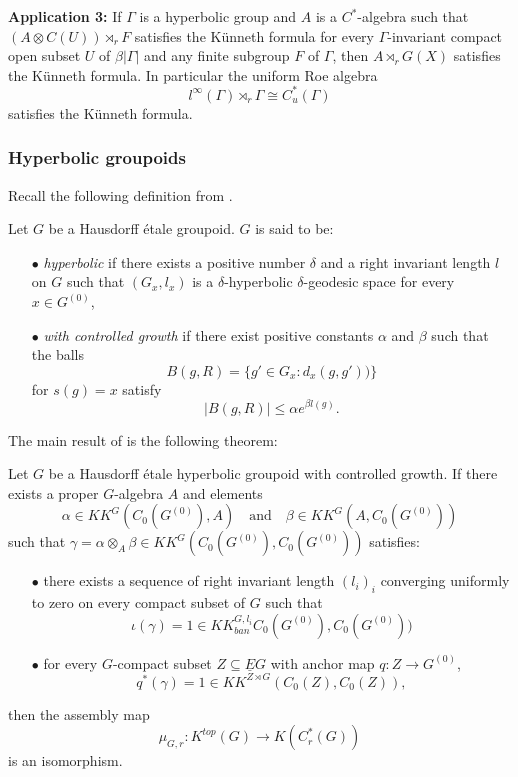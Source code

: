\textbf{Application 3:} If $\Gamma$ is a hyperbolic group and $A$ is a $C^*$-algebra such that $(A\otimes C(U))\rtimes_r F$ satisfies the Künneth formula for every $\Gamma$-invariant compact open subset $U$ of $\beta |\Gamma|$ and any finite subgroup $F$ of $\Gamma$, then $A\rtimes_r G(X)$ satisfies the Künneth formula. In particular the uniform Roe algebra \[l^\infty(\Gamma)\rtimes_r \Gamma\cong C_u^* (\Gamma)\] satisfies the Künneth formula.  

\subsubsection{Hyperbolic groupoids}
Recall the following definition from \cite{LaffOY}.

\begin{definition}\label{hyperbolicLaff}
Let $G$ be a Hausdorff \'etale groupoid. $G$ is said to be:
\begin{itemize}
\item[$\bullet$] \textit{hyperbolic} if there exists a positive number $\delta$ and a right invariant length $l$ on $G$ such that $(G_x, l_x)$ is a $\delta$-hyperbolic $\delta$-geodesic space for every $x\in G^{(0)}$,
\item[$\bullet$] \textit{with controlled growth} if there exist positive constants $\alpha $ and $\beta$ such that the balls 
\[B(g,R) = \{ g' \in G_x : d_x(g,g'))\}\] 
for $s(g)=x$ satisfy \[|B(g,R)| \leq \alpha e^{\beta l(g)}.\]
\end{itemize}
\end{definition}

The main result of \cite{LaffOY} is the following theorem:

\begin{thm}
Let $G$ be a Hausdorff \'etale hyperbolic groupoid with controlled growth. If there exists a proper $G$-algebra $A$ and elements 
\[\alpha \in KK^G(C_0(G^{(0)}) , A) \quad \text{and} \quad \beta\in KK^G(A, C_0(G^{(0)}))\]
such that $\gamma = \alpha \otimes_A \beta\in KK^G(C_0(G^{(0)}),C_0(G^{(0)}))$ satisfies:
\begin{itemize}
\item[$\bullet$] there exists a sequence of right invariant length $(l_i)_i$ converging uniformly to zero on every compact subset of $G$ such that 
\[\iota(\gamma) = 1 \in KK^{G,l_i}_{ban}C_0(G^{(0)}),C_0(G^{(0)}))\] 
\item[$\bullet$] for every $G$-compact subset $Z \subseteq \underline E G$ with anchor map $q: Z \rightarrow G^{(0)}$, 
\[q^*(\gamma) = 1 \in KK^{Z\rtimes G}(C_0(Z),C_0(Z)),\]
\end{itemize}
then the assembly map
\[\mu_{G,r} : K^{top}(G)\rightarrow K(C_r^*(G))\]
is an isomorphism.
\end{thm}

